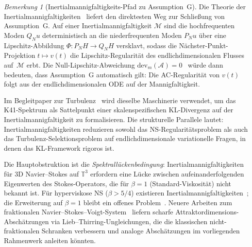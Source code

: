 \documentclass[12pt,a4paper]{article}
\theoremstyle{definition}
\theoremstyle{plain}
\theoremstyle{remark}
\newtheorem{remark}[definition]{Bemerkung}
\begin{document}
\begin{remark}[Inertialmannigfaltigkeits-Pfad zu Assumption~G]
\label{rem:inertial-manifold-path}
Die Theorie der Inertialmannigfaltigkeiten~\cite{FoiasSellTemam88} liefert
den direktesten Weg zur Schließung von Assumption~G\@. Auf einer
Inertialmannigfaltigkeit $\mathcal{M}$ sind die hochfrequenten Moden
$Q_N u$ deterministisch an die niederfrequenten Moden $P_N u$ über eine
Lipschitz-Abbildung $\Phi \colon P_N H \to Q_N H$ versklavt, sodass die
Nächster-Punkt-Projektion $t \mapsto v(t)$ die Lipschitz-Regularität
des endlichdimensionalen Flusses auf~$\mathcal{M}$ erbt. Die
Null-Lipschitz-Abweichung
$\mathrm{dev}_m(\mathcal{A}) = 0$~\cite{BaeCannone2016} würde dann
bedeuten, dass Assumption~G automatisch gilt: Die AC-Regularität von
$v(t)$ folgt aus der endlichdimensionalen ODE auf der Mannigfaltigkeit.

Im Begleitpaper zur Turbulenz~\cite{FST-TU2026} wird dieselbe
Maschinerie verwendet, um das K41-Spektrum als Sattelpunkt einer
skalenspezifischen KL-Divergenz auf der Inertialmannigfaltigkeit zu
formalisieren.
Die strukturelle Parallele lautet: Inertialmannigfaltigkeiten
reduzieren sowohl das NS-Regularitätsproblem als auch das
Turbulenz-Selektionsproblem auf endlichdimensionale variationelle
Fragen, in denen das KL-Framework rigoros ist.

Die Hauptobstruktion ist die \emph{Spektrallückenbedingung}:
Inertialmannigfaltigkeiten für 3D Navier--Stokes auf $\mathbb{T}^3$
erfordern eine Lücke zwischen aufeinanderfolgenden Eigenwerten des
Stokes-Operators, die für $\beta = 1$ (Standard-Viskosität) nicht
bekannt ist. Für hyperviskose NS ($\beta > 5/4$) existieren
Inertialmannigfaltigkeiten~\cite{EdenFoiasNicolaenko1994}; die
Erweiterung auf $\beta = 1$ bleibt ein offenes
Problem~\cite{Zelik2014}.
Neuere Arbeiten zum fraktionalen Navier--Stokes--Voigt-System~\cite{IlyinKalantarovZelik2025}
liefern scharfe Attraktordimensions-Abschätzungen via Lieb--Thirring-Ungleichungen,
die die klassischen nicht-fraktionalen Schranken verbessern und analoge Abschätzungen
im vorliegenden Rahmenwerk anleiten könnten.
\end{remark}
\end{document}
